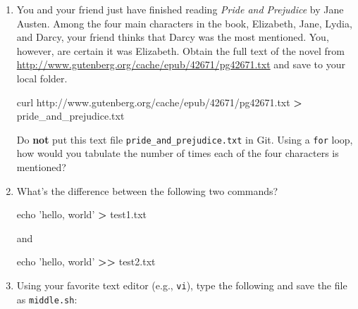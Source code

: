 \documentclass[
]{article}
\newenvironment{Shaded}{\begin{snugshade}}{\end{snugshade}}
\newcommand{\BuiltInTok}[1]{#1}
\newcommand{\CommentTok}[1]{\textcolor[rgb]{0.56,0.35,0.01}{\textit{#1}}}
\newcommand{\ExtensionTok}[1]{#1}
\newcommand{\FunctionTok}[1]{\textcolor[rgb]{0.00,0.00,0.00}{#1}}
\newcommand{\KeywordTok}[1]{\textcolor[rgb]{0.13,0.29,0.53}{\textbf{#1}}}
\newcommand{\NormalTok}[1]{#1}
\newcommand{\OperatorTok}[1]{\textcolor[rgb]{0.81,0.36,0.00}{\textbf{#1}}}
\newcommand{\StringTok}[1]{\textcolor[rgb]{0.31,0.60,0.02}{#1}}
\newcommand{\VariableTok}[1]{\textcolor[rgb]{0.00,0.00,0.00}{#1}}
\begin{document}
\begin{enumerate}
\def\labelenumi{\arabic{enumi}.}
\item
  You and your friend just have finished reading \emph{Pride and
  Prejudice} by Jane Austen. Among the four main characters in the book,
  Elizabeth, Jane, Lydia, and Darcy, your friend thinks that Darcy was
  the most mentioned. You, however, are certain it was Elizabeth. Obtain
  the full text of the novel from
  \url{http://www.gutenberg.org/cache/epub/42671/pg42671.txt} and save
  to your local folder.

\begin{Shaded}
\begin{Highlighting}[]
\ExtensionTok{curl}\NormalTok{ http://www.gutenberg.org/cache/epub/42671/pg42671.txt }\OperatorTok{>}\NormalTok{ pride_and_prejudice.txt}
\end{Highlighting}
\end{Shaded}

  Do \textbf{not} put this text file \texttt{pride\_and\_prejudice.txt}
  in Git. Using a \texttt{for} loop, how would you tabulate the number
  of times each of the four characters is mentioned?
\item
  What's the difference between the following two commands?

\begin{Shaded}
\begin{Highlighting}[]
\BuiltInTok{echo} \StringTok{'hello, world'} \OperatorTok{>}\NormalTok{ test1.txt}
\end{Highlighting}
\end{Shaded}

  and

\begin{Shaded}
\begin{Highlighting}[]
\BuiltInTok{echo} \StringTok{'hello, world'} \OperatorTok{>>}\NormalTok{ test2.txt}
\end{Highlighting}
\end{Shaded}
\item
  Using your favorite text editor (e.g., \texttt{vi}), type the
  following and save the file as \texttt{middle.sh}:

\begin{Shaded}
\end{Shaded}


\end{enumerate}
\end{document}
